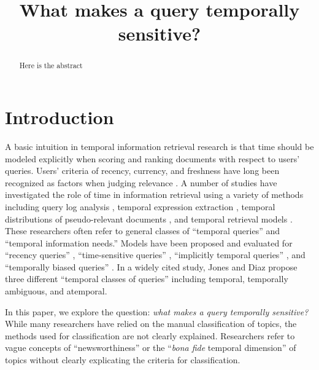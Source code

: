 \documentclass{sig-alternate}
\begin{document}
%

\title{What makes a query temporally sensitive?}

\maketitle
\begin{abstract}
Here is the abstract
\end{abstract}


\terms{}

\keywords{}

\section{Introduction}

A basic intuition in temporal information retrieval research is that time should be modeled explicitly when scoring and ranking documents with respect to users' queries. Users' criteria of recency, currency, and freshness have long been recognized as factors when judging relevance \cite{Barry1998}. A number of studies have investigated the role of time in information retrieval using a variety of methods including query log analysis \cite{Kulkarni2011,Shokouhi2011,Metzler2009}, temporal expression extraction \cite{Berberich2010, Kanhabua2011}, temporal distributions of pseudo-relevant documents \cite{Jones2007}, and temporal retrieval models \cite{Li2003, Efron2011, Dakka2012}. These researchers often refer to general classes of ``temporal queries'' and ``temporal information needs.''  Models have been proposed and evaluated for ``recency queries'' \cite{Li2003, Efron2011}, ``time-sensitive queries'' \cite{Dakka2012}, ``implicitly temporal queries'' \cite{Metzler2009}, and ``temporally biased queries'' \cite{Jones2007}. In a widely cited study, Jones and Diaz propose three different ``temporal classes of queries'' \cite{Jones2007} including temporal, temporally ambiguous, and atemporal.

In this paper, we explore the question: \emph{what makes a query temporally sensitive?}  While many researchers have relied on the manual classification of topics, the methods used for classification are not clearly explained. Researchers refer to vague concepts of ``newsworthiness'' or  the ``\emph{bona fide} temporal dimension'' of topics without clearly explicating the criteria for classification.
\end{document}
